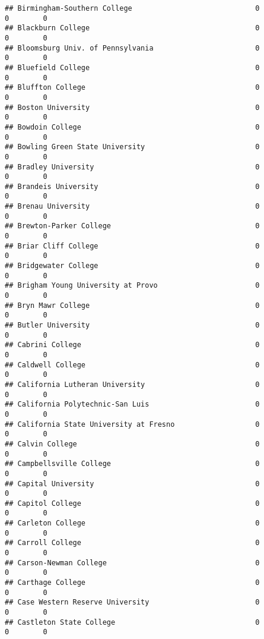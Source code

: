 \documentclass[
]{article}
\begin{document}
\begin{verbatim}
## Birmingham-Southern College                             0           0        0
## Blackburn College                                       0           0        0
## Bloomsburg Univ. of Pennsylvania                        0           0        0
## Bluefield College                                       0           0        0
## Bluffton College                                        0           0        0
## Boston University                                       0           0        0
## Bowdoin College                                         0           0        0
## Bowling Green State University                          0           0        0
## Bradley University                                      0           0        0
## Brandeis University                                     0           0        0
## Brenau University                                       0           0        0
## Brewton-Parker College                                  0           0        0
## Briar Cliff College                                     0           0        0
## Bridgewater College                                     0           0        0
## Brigham Young University at Provo                       0           0        0
## Bryn Mawr College                                       0           0        0
## Butler University                                       0           0        0
## Cabrini College                                         0           0        0
## Caldwell College                                        0           0        0
## California Lutheran University                          0           0        0
## California Polytechnic-San Luis                         0           0        0
## California State University at Fresno                   0           0        0
## Calvin College                                          0           0        0
## Campbellsville College                                  0           0        0
## Capital University                                      0           0        0
## Capitol College                                         0           0        0
## Carleton College                                        0           0        0
## Carroll College                                         0           0        0
## Carson-Newman College                                   0           0        0
## Carthage College                                        0           0        0
## Case Western Reserve University                         0           0        0
## Castleton State College                                 0           0        0

\end{verbatim}
\end{document}
